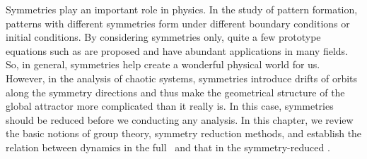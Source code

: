 
Symmetries play an important role in physics. In the study of
pattern formation,
patterns with different symmetries form under different boundary conditions or
initial conditions. By considering symmetries only, quite a few
prototype equations such as \cGLe{}
are proposed and have abundant applications in many fields.
So, in general,
symmetries help create a wonderful physical world for us.
However, in the analysis of chaotic systems, symmetries introduce
drifts of orbits along the symmetry directions and thus make the geometrical
structure of the global attractor more complicated than it really is.
In this case,
symmetries should be reduced before we conducting any analysis. In this chapter,
we review the basic notions of group theory, symmetry reduction
methods, and establish the relation between dynamics in the full \statesp\
and that in the symmetry-reduced \statesp.
